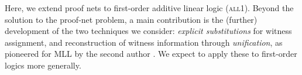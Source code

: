 \documentclass[twoside,a4paper]{article}
\newcommand\defn[1]{\textit{\textbf{#1}}}
\newcommand\all{\textsc{all}}
\newcommand\+{+}
\renewcommand\*{\times}
\newcommand\dual[1]{\overline{#1}}
\newcommand\seq[2]{{\vdash}#1,#2}
\begin{document}
Here, we extend proof nets to first-order additive linear logic (\all1). Beyond the solution to the proof-net problem, a main contribution is the (further) development of the two techniques we consider: \emph{explicit substitutions} for witness assignment, and reconstruction of witness information through \emph{unification}, as pioneered for MLL by the second author \cite{Hughes-2018}. We expect to apply these to first-order logics more generally.

%
%
\end{document}
